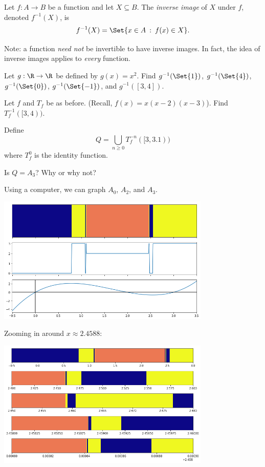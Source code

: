 	\newpage
	\begin{definition}
		Let $f:A\to B$ be a function and let $X\subseteq B$. The \emph{inverse image} of $X$
		under $f$, denoted $f^{-1}(X)$, is
		\[
			f^{-1}(X)=\Set{x\in A\given f(x)\in X}.
		\]
	\end{definition}
	Note: a function \emph{need not} be invertible to have inverse images. In fact, the idea of inverse images applies
	to \emph{every} function.

	\question
	\begin{parts}
		\item Let $g:\R\to\R$ be defined by $g(x)=x^2$. Find $g^{-1}(\Set{1})$,
			$g^{-1}(\Set{4})$, $g^{-1}(\Set{0})$, $g^{-1}(\Set{-1})$, and $g^{-1}([3,4])$.
		\item Let $f$ and $T_f$ be as before. (Recall, $f(x)=x(x-2)(x-3)$). Find $T_f^{-1}([3,4))$.
		\item Define
			\[
				Q=\bigcup_{n\geq 0} T_f^{-n}([3,3.1))
			\]
			where $T_f^0$ is the identity function.

			Is $Q=A_3$? Why or why not?
	\end{parts}

	\newpage
	Using a computer, we can graph $A_0$, $A_2$, and $A_3$.

	\begin{center}
	\includegraphics[width=4in]{images/newt1.png}
	\end{center}
	
	\newpage
	Zooming in around $x\approx 2.4588$:

	\begin{center}
	\includegraphics[width=4in]{images/newt2.png}
	\end{center}

